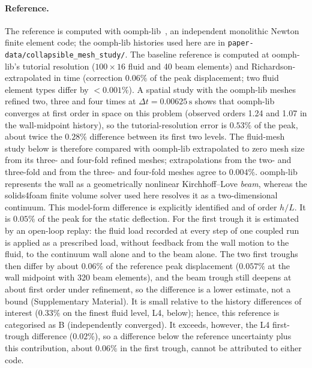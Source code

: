 \paragraph{Reference.}
The reference is computed with oomph-lib~\citep{Heil2006}, an independent monolithic Newton finite element code; the oomph-lib histories used here are in \texttt{paper-data/collapsible\_mesh\_study/}.
The baseline reference is computed at oomph-lib's tutorial resolution ($100\times16$ fluid and 40 beam elements) and Richardson-extrapolated in time (correction $0.06\%$ of the peak displacement; two fluid element types differ by $<0.001\%$). A spatial study with the oomph-lib meshes refined two, three and four times at $\Delta t = 0.00625\,\mathrm{s}$ shows that oomph-lib converges at first order in space on this problem (observed orders 1.24 and 1.07 in the wall-midpoint history), so the tutorial-resolution error is $0.53\%$ of the peak, about twice the $0.28\%$ difference between its first two levels. The fluid-mesh study below is therefore compared with oomph-lib extrapolated to zero mesh size from its three- and four-fold refined meshes; extrapolations from the two- and three-fold and from the three- and four-fold meshes agree to $0.004\%$.
oomph-lib represents the wall as a geometrically nonlinear Kirchhoff--Love \emph{beam}, whereas the solids4foam finite volume solver used here resolves it as a two-dimensional continuum.
This model-form difference is explicitly identified and of order $h/L$. It is $0.05\%$ of the peak for the static deflection.
For the first trough it is estimated by an open-loop replay: the fluid load recorded at every step of one coupled run is applied as a prescribed load, without feedback from the wall motion to the fluid, to the continuum wall alone and to the beam alone.
The two first troughs then differ by about $0.06\%$ of the reference peak displacement ($0.057\%$ at the wall midpoint with 320 beam elements), and the beam trough still deepens at about first order under refinement, so the difference is a lower estimate, not a bound (Supplementary Material).
It is small relative to the history differences of interest ($0.33\%$ on the finest fluid level, L4, below); hence, this reference is categorised as B (independently converged). It exceeds, however, the L4 first-trough difference ($0.02\%$), so a difference below the reference uncertainty plus this contribution, about $0.06\%$ in the first trough, cannot be attributed to either code.


